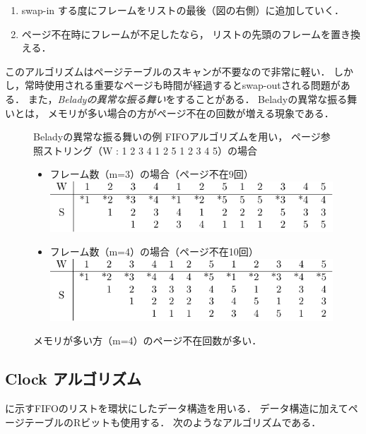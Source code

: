 \begin{enumerate}
\item swap-in する度にフレームをリストの最後（図の右側）に追加していく．
\item ページ不在時にフレームが不足したなら，
  リストの先頭のフレームを置き換える．
\end{enumerate}

このアルゴリズムはページテーブルのスキャンが不要なので非常に軽い．
しかし，常時使用される重要なページも時間が経過するとswap-outされる問題がある．
また，\emph{Beladyの異常な振る舞い}をすることがある．
Beladyの異常な振る舞いとは，
メモリが多い場合の方がページ不在の回数が増える現象である．

\begin{figure}[btp]
  \begin{itembox}[l]{Beladyの異常な振る舞いの例}
    FIFOアルゴリズムを用い，
    ページ参照ストリング（W : 1 2 3 4 1 2 5 1 2 3 4 5）の場合
    \begin{itemize}
    \item フレーム数（m=3）の場合（ページ不在9回）\\
      \includegraphics[scale=1.0]{Tbl/beladyAnomalyM3.pdf}
    \item フレーム数（m=4）の場合（ページ不在10回）\\
      \includegraphics[scale=1.0]{Tbl/beladyAnomalyM4.pdf}
    \end{itemize}
    メモリが多い方（m=4）のページ不在回数が多い．
  \end{itembox}
\end{figure}

\subsection{Clock アルゴリズム}
に示すFIFOのリストを環状にしたデータ構造を用いる．
データ構造に加えてページテーブルのRビットも使用する．
次のようなアルゴリズムである．

